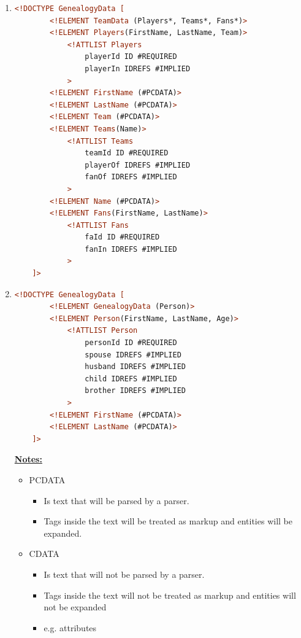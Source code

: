 \documentclass[12pt]{article}
\begin{document}
\begin{enumerate}[1.]
    \item

    \begin{lstlisting}[language=XML]
    <!DOCTYPE GenealogyData [
        <!ELEMENT TeamData (Players*, Teams*, Fans*)>
        <!ELEMENT Players(FirstName, LastName, Team)>
            <!ATTLIST Players
                playerId ID #REQUIRED
                playerIn IDREFS #IMPLIED
            >
        <!ELEMENT FirstName (#PCDATA)>
        <!ELEMENT LastName (#PCDATA)>
        <!ELEMENT Team (#PCDATA)>
        <!ELEMENT Teams(Name)>
            <!ATTLIST Teams
                teamId ID #REQUIRED
                playerOf IDREFS #IMPLIED
                fanOf IDREFS #IMPLIED
            >
        <!ELEMENT Name (#PCDATA)>
        <!ELEMENT Fans(FirstName, LastName)>
            <!ATTLIST Fans
                faId ID #REQUIRED
                fanIn IDREFS #IMPLIED
            >
    ]>
    \end{lstlisting}

    \item

    \begin{lstlisting}[language=XML]
    <!DOCTYPE GenealogyData [
        <!ELEMENT GenealogyData (Person)>
        <!ELEMENT Person(FirstName, LastName, Age)>
            <!ATTLIST Person
                personId ID #REQUIRED
                spouse IDREFS #IMPLIED
                husband IDREFS #IMPLIED
                child IDREFS #IMPLIED
                brother IDREFS #IMPLIED
            >
        <!ELEMENT FirstName (#PCDATA)>
        <!ELEMENT LastName (#PCDATA)>
    ]>
    \end{lstlisting}


    \bigskip

    \underline{\textbf{Notes:}}

    \bigskip

    \begin{itemize}
        \item PCDATA
        \begin{itemize}
            \item Is text that will be parsed by a parser.
            \item Tags inside the text will be treated as markup and entities will be expanded.
        \end{itemize}
        \item CDATA
        \begin{itemize}
            \item Is text that will not be parsed by a parser.
            \item Tags inside the text will not be treated as markup and entities will not be expanded
            \item e.g. attributes


\end{itemize}
\end{itemize}
\end{enumerate}
\end{document}
